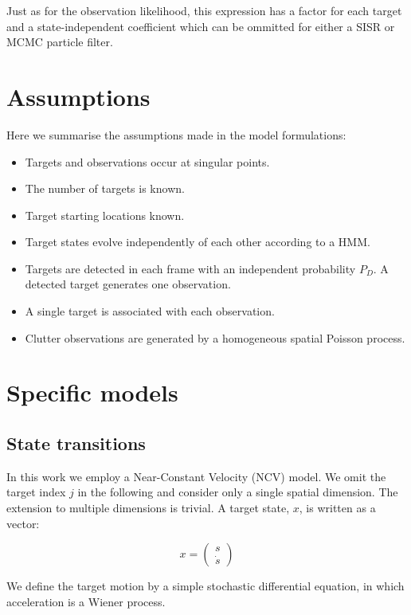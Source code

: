 Just as for the observation likelihood, this expression has a factor for each target and a state-independent coefficient which can be ommitted for either a SISR or MCMC particle filter.



\section{Assumptions}
Here we summarise the assumptions made in the model formulations:

\begin{itemize}
	\item Targets and observations occur at singular points.
	\item The number of targets is known.
	\item Target starting locations known.
	\item Target states evolve independently of each other according to a HMM.
	\item Targets are detected in each frame with an independent probability $P_D$. A detected target generates one observation.
	\item A single target is associated with each observation.
	\item Clutter observations are generated by a homogeneous spatial Poisson process.
\end{itemize}



\section{Specific models}

\subsection{State transitions}
In this work we employ a Near-Constant Velocity (NCV) model. We omit the target index $j$ in the following and consider only a single spatial dimension. The extension to multiple dimensions is trivial. A target state, $x$, is written as a vector:

\begin{equation}
x = \begin{pmatrix}
	s \\ \dot{s}
\end{pmatrix}
\label{eq:}
\end{equation}

We define the target motion by a simple stochastic differential equation, in which acceleration is a Wiener process.

